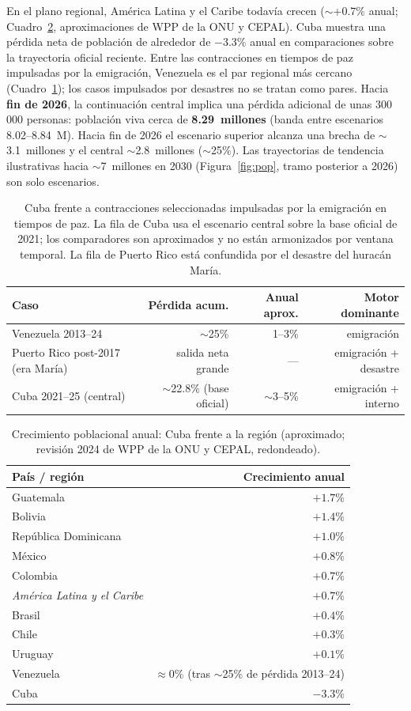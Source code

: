 \documentclass[11pt,a4paper]{article}
\begin{document}
En el plano regional, América Latina y el Caribe todavía crecen ($\sim$+$0.7\%$ anual; Cuadro~\ref{tab:region}, aproximaciones de WPP de la ONU y CEPAL).
Cuba muestra una pérdida neta de población de alrededor de $-$3.3\% anual en comparaciones sobre la trayectoria oficial reciente.
Entre las contracciones en tiempos de paz impulsadas por la emigración, Venezuela es el par regional más cercano (Cuadro~\ref{tab:hist}); los casos impulsados por desastres no se tratan como pares.
Hacia \textbf{fin de 2026}, la continuación central implica una pérdida adicional de unas 300\,000 personas: población viva cerca de \textbf{8.29~millones} (banda entre escenarios 8.02--8.84~M).
Hacia fin de 2026 el escenario superior alcanza una brecha de $\sim$3.1~millones y el central $\sim$2.8~millones ($\sim$25\%).
Las trayectorias de tendencia ilustrativas hacia $\sim$7~millones en 2030 (Figura~\ref{fig:pop}, tramo posterior a 2026) son solo escenarios.

\begin{table}[ht]
\centering
\caption{Cuba frente a contracciones seleccionadas impulsadas por la emigración en tiempos de paz.
La fila de Cuba usa el escenario central sobre la base oficial de 2021; los comparadores son aproximados y no están armonizados por ventana temporal. La fila de Puerto Rico está confundida por el desastre del huracán María.}
\label{tab:hist}
\begin{tabular}{lrrr}
\toprule
Caso & Pérdida acum. & Anual aprox. & Motor dominante \\
\midrule
Venezuela 2013--24 & $\sim$25\% & 1--3\% & emigración \\
Puerto Rico post-2017 (era Mar{\'i}a) & salida neta grande & --- & emigración + desastre \\
Cuba 2021--25 (central) & $\sim$22.8\% (base oficial) & $\sim$3--5\% & emigración + interno \\
\bottomrule
\end{tabular}
\end{table}

\begin{table}[ht]
\centering
\caption{Crecimiento poblacional anual: Cuba frente a la región (aproximado; revisión 2024 de WPP de la ONU y CEPAL, redondeado).}
\label{tab:region}
\begin{tabular}{lr}
\toprule
País / región & Crecimiento anual \\
\midrule
Guatemala & $+1.7\%$ \\
Bolivia & $+1.4\%$ \\
República Dominicana & $+1.0\%$ \\
México & $+0.8\%$ \\
Colombia & $+0.7\%$ \\
\textit{América Latina y el Caribe} & $+0.7\%$ \\
Brasil & $+0.4\%$ \\
Chile & $+0.3\%$ \\
Uruguay & $+0.1\%$ \\
Venezuela & $\approx 0\%$ (tras $\sim$25\% de pérdida 2013--24) \\
Cuba & $-3.3\%$ \\
\bottomrule
\end{tabular}
\end{table}
\end{document}
